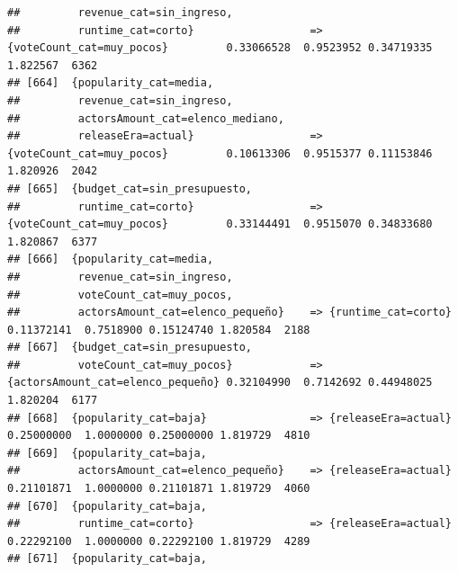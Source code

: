 \documentclass[
]{article}
\begin{document}
\begin{verbatim}
##         revenue_cat=sin_ingreso,                                                                                                
##         runtime_cat=corto}                  => {voteCount_cat=muy_pocos}         0.33066528  0.9523952 0.34719335 1.822567  6362
## [664]  {popularity_cat=media,                                                                                                   
##         revenue_cat=sin_ingreso,                                                                                                
##         actorsAmount_cat=elenco_mediano,                                                                                        
##         releaseEra=actual}                  => {voteCount_cat=muy_pocos}         0.10613306  0.9515377 0.11153846 1.820926  2042
## [665]  {budget_cat=sin_presupuesto,                                                                                             
##         runtime_cat=corto}                  => {voteCount_cat=muy_pocos}         0.33144491  0.9515070 0.34833680 1.820867  6377
## [666]  {popularity_cat=media,                                                                                                   
##         revenue_cat=sin_ingreso,                                                                                                
##         voteCount_cat=muy_pocos,                                                                                                
##         actorsAmount_cat=elenco_pequeño}    => {runtime_cat=corto}               0.11372141  0.7518900 0.15124740 1.820584  2188
## [667]  {budget_cat=sin_presupuesto,                                                                                             
##         voteCount_cat=muy_pocos}            => {actorsAmount_cat=elenco_pequeño} 0.32104990  0.7142692 0.44948025 1.820204  6177
## [668]  {popularity_cat=baja}                => {releaseEra=actual}               0.25000000  1.0000000 0.25000000 1.819729  4810
## [669]  {popularity_cat=baja,                                                                                                    
##         actorsAmount_cat=elenco_pequeño}    => {releaseEra=actual}               0.21101871  1.0000000 0.21101871 1.819729  4060
## [670]  {popularity_cat=baja,                                                                                                    
##         runtime_cat=corto}                  => {releaseEra=actual}               0.22292100  1.0000000 0.22292100 1.819729  4289
## [671]  {popularity_cat=baja,                                                                                                    

\end{verbatim}
\end{document}
